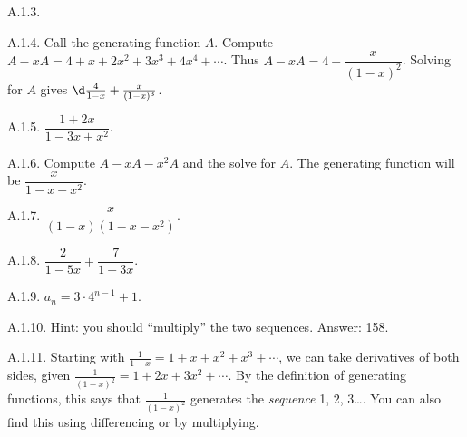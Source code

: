 \begin {itemize}
\begin{ans}{A.1.3.}
\end{ans}
\begin{ans}{A.1.4.}
		Call the generating function $A$.  Compute $A - xA = 4 + x + 2x^2 + 3x^3 + 4x^4 + \cdots$.  Thus $A - xA = 4 + \dfrac{x}{(1-x)^2}$.  Solving for $A$ gives $\d\frac{4}{1-x} + \frac{x}{(1-x)^3}$.  %
	
\end{ans}
\begin{ans}{A.1.5.}
		$\dfrac{1+2x}{1-3x + x^2}$.  %
	
\end{ans}
\begin{ans}{A.1.6.}
		Compute $A - xA - x^2A$ and the solve for $A$.  The generating function will be $\dfrac{x}{1-x-x^2}$.  %
	
\end{ans}
\begin{ans}{A.1.7.}
		$\dfrac{x}{(1-x)(1-x-x^2)}$.  %
	
\end{ans}
\begin{ans}{A.1.8.}
		$\dfrac{2}{1-5x} + \dfrac{7}{1+3x}$.  %
	
\end{ans}
\begin{ans}{A.1.9.}
		$a_n = 3\cdot 4^{n-1} + 1$.  %
	
\end{ans}
\begin{ans}{A.1.10.}
		Hint: you should ``multiply'' the two sequences.  Answer: 158.  %
	
\end{ans}
\begin{ans}{A.1.11.}
		Starting with $\frac{1}{1-x} = 1 + x + x^2 + x^3 +\cdots$, we can take derivatives of both sides, given $\frac{1}{(1-x)^2} = 1 + 2x + 3x^2 + \cdots$.  By the definition of generating functions, this says that $\frac{1}{(1-x)^2}$ generates the {\em sequence} 1, 2, 3\ldots.  You can also find this using differencing or by multiplying.
	

\end{ans}
\end{itemize}
